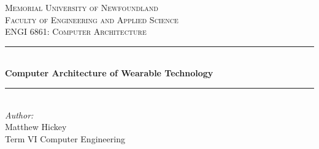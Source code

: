 \newcommand{\HRule}{\rule{\linewidth}{0.5mm}} %

\center %


\textsc{\LARGE Memorial University of Newfoundland}\\[1.5cm]
\textsc{\Large Faculty of Engineering and Applied Science}\\[0.5cm] %
\textsc{\large ENGI 6861: Computer Architecture}\\[0.5cm] %


\HRule \\[0.4cm]
{ \huge \bfseries Computer Architecture of Wearable Technology}\\[0.4cm] %
\HRule \\[1.5cm]


\Large \emph{Author:}\\
Matthew Hickey\\ %
Term VI Computer Engineering\\[2cm]


